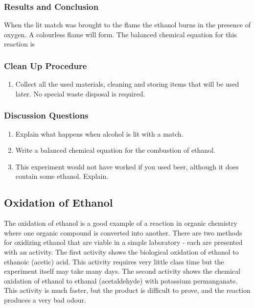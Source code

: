 \subsubsection*{Results and Conclusion}
When the lit match was brought to the flame the ethanol burns in the presence of oxygen. A colourless flame will form. The balanced chemical equation for this reaction is
\begin{center}
\end{center}

\subsubsection*{Clean Up Procedure}
\begin{enumerate}
\item{Collect all the used materials, cleaning and storing items that will be used later. No special waste disposal is required.}
\end{enumerate}

\subsubsection*{Discussion Questions}
\begin{enumerate}
\item{Explain what happens when alcohol is lit with a match.}
\item{Write a balanced chemical equation for the combustion of ethanol.}
\item{This experiment would not have worked if you used beer, although it does contain some ethanol. Explain.}
\end{enumerate}

\subsection{Oxidation of Ethanol}

The oxidation of ethanol is a good example of a reaction in organic chemistry where one organic compound is converted into another. There are two methods for oxidizing ethanol that are viable in a simple laboratory - each are presented with an activity. The first activity shows the biological oxidation of ethanol to ethanoic (acetic) acid. This activity requires very little class time but the experiment itself may take many days. The second activity shows the chemical oxidation of ethanol to ethanal (acetaldehyde) with potassium permanganate. This activity is much faster, but the product is difficult to prove, and the reaction produces a very bad odour.

